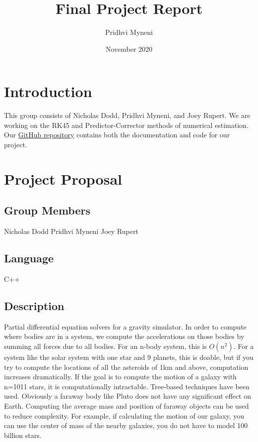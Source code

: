 \documentclass[12pt, letterpaper]{article}
\title{Final Project Report}
\author{Pridhvi Myneni }
\date{November 2020}
\begin{document}
\maketitle

\tableofcontents

\section{Introduction}
This group consists of Nicholas Dodd, Pridhvi Myneni, and Joey Rupert. We are working on the RK45 and Predictor-Corrector methods of numerical estimation. Our \href{https://github.com/PMARINA/CPE593-FinalProject}{GitHub repository}  contains both the documentation and code for our project.

\section{Project Proposal}
\subsection{Group Members}
Nicholas Dodd
Pridhvi Myneni
Joey Rupert

\subsection{Language}
C++

\subsection{Description}

Partial differential equation solvers for a gravity simulator. In order to compute where bodies are in a system, we compute the accelerations on those bodies by summing all forces due to all bodies. For an n-body system, this is \(O(n^2)\). For a system like the solar system with one star and 9 planets, this is doable, but if you try to compute the locations of all the asteroids of 1km and above, computation increases dramatically. If the goal is to compute the motion of a galaxy with n=1011 stars, it is computationally intractable. Tree-based techniques have been used. Obviously a faraway body like Pluto does not have any significant effect on Earth. Computing the average mass and position of faraway objects can be used to reduce complexity. For example, if calculating the motion of our galaxy, you can use the center of mass of the nearby galaxies, you do not have to model 100 billion stars.
\end{document}
